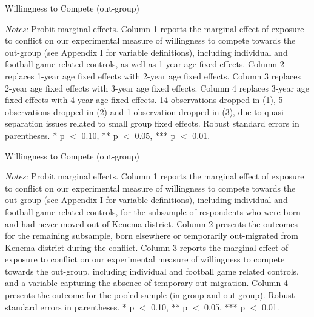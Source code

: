 \begin{threeparttable}[tp]
	\caption{Willingness to Compete (out-group)}
	\label{tab:slf:compete_fe}
	\centering
	\tiny
	
	\begin{tablenotes}
		\item \textit{Notes:} Probit marginal effects. Column 1 reports the marginal effect of exposure to conflict on our experimental measure of willingness to compete towards the out-group (see Appendix I for variable definitions), including individual and football game related controls, as well as 1-year age fixed effects. Column 2 replaces 1-year age fixed effects with 2-year age fixed effects. Column 3 replaces 2-year age fixed effects with 3-year age fixed effects. Column 4 replaces 3-year age fixed effects with 4-year age fixed effects. 14 observations dropped in (1), 5 observations dropped in (2) and 1 observation dropped in (3), due to quasi-separation issues related to small group fixed effects. Robust standard errors in parentheses. * p $<$ 0.10, ** p $<$ 0.05, *** p $<$ 0.01.
		\item
	\end{tablenotes}
\end{threeparttable}

\clearpage

\begin{threeparttable}[tp]
	\caption{Willingness to Compete (out-group)}
	\label{tab:slf:compete_migrate}
	\centering
	\tiny
	
	\begin{tablenotes}
		\item \textit{Notes:} Probit marginal effects. Column 1 reports the marginal effect of exposure to conflict on our experimental measure of willingness to compete towards the out-group (see Appendix I for variable definitions), including individual and football game related controls, for the subsample of respondents who were born and had never moved out of Kenema district. Column 2 presents the outcomes for the remaining subsample, born elsewhere or temporarily out-migrated from Kenema district during the conflict. Column 3 reports the marginal effect of exposure to conflict on our experimental measure of willingness to compete towards the out-group, including individual and football game related controls, and a variable capturing the absence of temporary out-migration. Column 4 presents the outcome for the pooled sample (in-group and out-group). Robust standard errors in parentheses. * p $<$ 0.10, ** p $<$ 0.05, *** p $<$ 0.01.
		\item
	\end{tablenotes}
\end{threeparttable}

